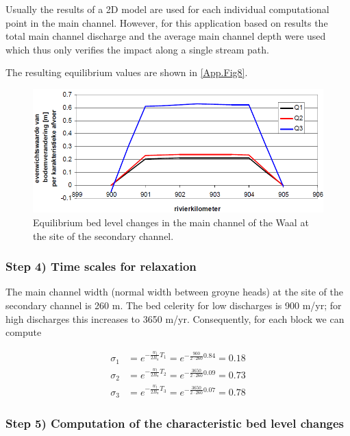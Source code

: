 \Note Usually the results of a 2D model are used for each individual computational point in the main channel.
However, for this application based on \sobek results the total main channel discharge and the average main channel depth were used which thus only verifies the impact along a single stream path.

The resulting equilibrium values are shown in \autoref{App.Fig8}.

\begin{figure}
\includegraphics[width=\columnwidth]{figures/Fig8.png}
\caption{Equilibrium bed level changes in the main channel of the Waal at the site of the secondary channel.}
\label{App.Fig8}
\end{figure}

\subsubsection*{Step 4) Time scales for relaxation}

The main channel width (normal width between groyne heads) at the site of the secondary channel is 260 m.
The bed celerity for low discharges is 900 m/yr; for high discharges this increases to 3650 m/yr.
Consequently, for each block we can compute

\begin{align}
\sigma_1 &= e^{-\frac{w_l}{2B_n}T_1} = e^{-\frac{900}{2 \cdot 260} 0.84} = 0.18 \\
\sigma_2 &= e^{-\frac{w_l}{2B_n}T_2} = e^{-\frac{3650}{2 \cdot 260} 0.09} = 0.73 \\
\sigma_3 &= e^{-\frac{w_l}{2B_n}T_3} = e^{-\frac{3650}{2 \cdot 260} 0.07} = 0.78
\end{align}

\subsubsection*{Step 5) Computation of the characteristic bed level changes}

